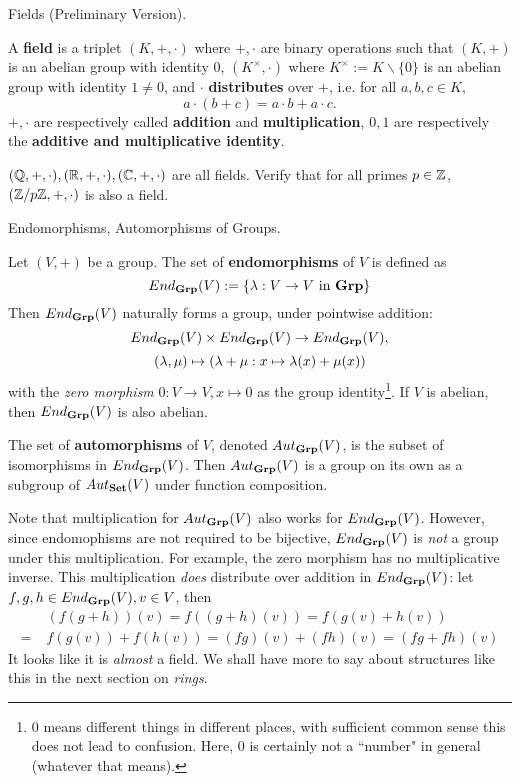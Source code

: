 \documentclass[../book.tex]{subfiles}
\begin{document}
\begin{dfn} Fields (Preliminary Version).

    A \textbf{field} is a triplet $(K,+,\cdot)$ where
    $+, \cdot$ are binary operations such that
    $(K,+)$ is an abelian group with identity $0$,
    $(K^\times,\cdot)$ where $K^\times := K\backslash\{0\}$
    is an abelian group with identity $1 \neq 0$,
    and $\cdot$ \textbf{distributes} over $+$, i.e. for all
    $a, b, c \in K,$ 
    \[a \cdot (b + c) = a \cdot b + a \cdot c.\]
    $+,\cdot$ are respectively called \textbf{addition} and \textbf{multiplication}, 
    $0, 1$ are respectively the \textbf{additive and multiplicative identity}. 
\end{dfn}

\begin{eg}
    $(\mathbb{Q},+,\cdot), (\mathbb{R},+,\cdot), (\mathbb{C},+,\cdot)$ are all fields. 
    Verify that for all primes $p \in \mathbb{Z}$, $(\mathbb{Z}/p\mathbb{Z},+,\cdot)$
    is also a field.
\end{eg}

\begin{dfn} Endomorphisms, Automorphisms of Groups.

    Let $(V,+)$ be a group. 
    The set of \textbf{endomorphisms} of $V$ is defined as
    \[ 
        End_{\mathbf{Grp}}(V) := \{\lambda : V \to V \text{ in } \mathbf{Grp}\} 
    \]
    Then $End_{\mathbf{Grp}}(V)$ naturally forms a group, under pointwise addition:
    \[
        End_{\mathbf{Grp}}(V) \times End_{\mathbf{Grp}}(V) \to End_{\mathbf{Grp}}(V), 
    \]
    \[
        (\lambda, \mu) \mapsto (\lambda + \mu : x \mapsto \lambda(x) + \mu(x))
    \]
    with the \emph{zero morphism} $0 : V \to V, 
    x \mapsto 0$ as the group identity\footnote{
    $0$ means different things in different places,
    with sufficient common sense this does not lead to confusion. 
    Here, $0$ is certainly not a ``number" in general 
    (whatever that means).}.
    If $V$ is abelian, then $End_{\mathbf{Grp}}(V)$ is also abelian. 
    
    The set of \textbf{automorphisms} of $V$, denoted $Aut_{\mathbf{Grp}}(V)$, 
    is the subset of isomorphisms in $End_{\mathbf{Grp}}(V)$. 
    Then $Aut_{\mathbf{Grp}}(V)$ is a group on its own
    as a subgroup of $Aut_{\mathbf{Set}}(V)$ under function composition. 
    
\end{dfn}

\begin{rmk}
    Note that multiplication for $Aut_{\mathbf{Grp}}(V)$ also works for $End_{\mathbf{Grp}}(V)$.
    However, since endomophisms are not required to be bijective, 
    $End_{\mathbf{Grp}}(V)$ is \emph{not} a group under this multiplication. 
    For example, the zero morphism has no multiplicative inverse. 
    This multiplication \emph{does} distribute over addition in $End_{\mathbf{Grp}}(V)$: let $f, g, h \in End_{\mathbf{Grp}}(V), v \in V$, then
    \begin{align*}
        &(f(g + h))(v) = f((g+h)(v)) = f(g(v) + h(v)) \\
        =\;& f(g(v)) + f(h(v)) = (fg)(v) + (fh)(v) = (fg + fh)(v)
    \end{align*}
    It looks like it is \emph{almost} a field. 
    We shall have more to say about structures like this 
    in the next section on \emph{rings}. 
\end{rmk}
\end{document}
